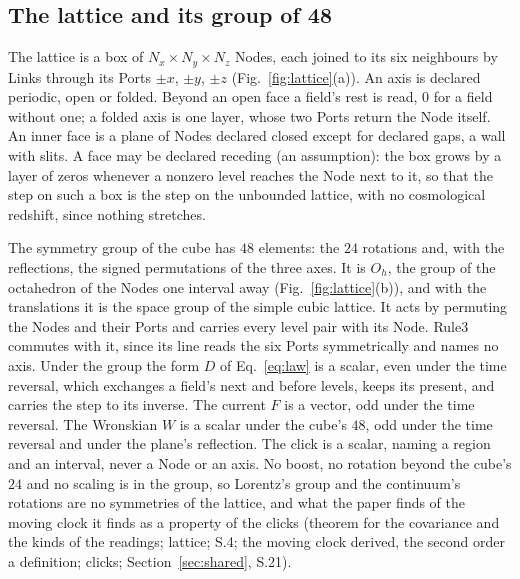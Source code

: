 \documentclass[pdflatex,sn-mathphys-num]{sn-jnl}
\theoremstyle{thmstyleone}
\theoremstyle{thmstyletwo}
\begin{document}
\subsection{The lattice and its group of 48}\label{sec:lattice}

The lattice is a box of $N_x \times N_y \times N_z$ Nodes, each joined to its six neighbours by Links through its Ports $\pm x$, $\pm y$, $\pm z$ (Fig.~\ref{fig:lattice}(a)). An axis is declared periodic, open or folded. Beyond an open face a field's rest is read, $0$ for a field without one; a folded axis is one layer, whose two Ports return the Node itself. An inner face is a plane of Nodes declared closed except for declared gaps, a wall with slits. A face may be declared receding (an assumption): the box grows by a layer of zeros whenever a nonzero level reaches the Node next to it, so that the step on such a box is the step on the unbounded lattice, with no cosmological redshift, since nothing stretches.

The symmetry group of the cube has $48$ elements: the $24$ rotations and, with the reflections, the signed permutations of the three axes. It is $O_h$, the group of the octahedron of the Nodes one interval away (Fig.~\ref{fig:lattice}(b)), and with the translations it is the space group of the simple cubic lattice. It acts by permuting the Nodes and their Ports and carries every level pair with its Node. Rule3 commutes with it, since its line reads the six Ports symmetrically and names no axis. Under the group the form $D$ of Eq.~\eqref{eq:law} is a scalar, even under the time reversal, which exchanges a field's next and before levels, keeps its present, and carries the step to its inverse. The current $F$ is a vector, odd under the time reversal. The Wronskian $W$ is a scalar under the cube's $48$, odd under the time reversal and under the plane's reflection. The click is a scalar, naming a region and an interval, never a Node or an axis. No boost, no rotation beyond the cube's $24$ and no scaling is in the group, so Lorentz's group and the continuum's rotations are no symmetries of the lattice, and what the paper finds of the moving clock it finds as a property of the clicks (theorem for the covariance and the kinds of the readings; lattice; S.4; the moving clock derived, the second order a definition; clicks; Section~\ref{sec:shared}, S.21).
\end{document}
